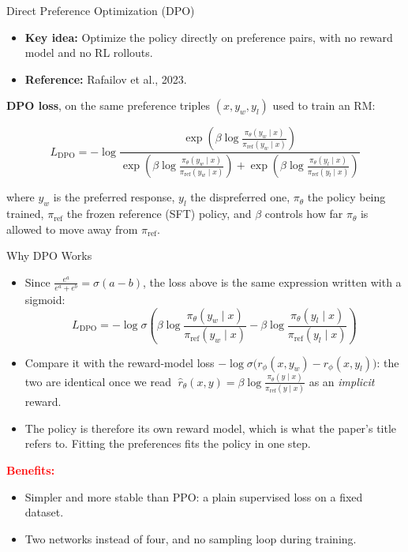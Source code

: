 \begin{frame}[t]{Direct Preference Optimization (DPO)}
  \begin{itemize}
    \item[\textcolor{red}{$\blacktriangleright$}] \textbf{Key idea:} Optimize the policy directly on preference pairs, with no reward model and no RL rollouts.
    \item[\textcolor{red}{$\blacktriangleright$}] \textbf{Reference:} Rafailov et al., 2023.
  \end{itemize}

  \vspace{0.4em}
  \textbf{DPO loss}, on the same preference triples $(x, y_w, y_l)$ used to train an RM:

  \[
  L_{\mathrm{DPO}} = -\log \frac{
      \exp\left(\beta \log \frac{\pi_\theta(y_w \mid x)}{\pi_{\text{ref}}(y_w \mid x)}\right)
    }{
      \exp\left(\beta \log \frac{\pi_\theta(y_w \mid x)}{\pi_{\text{ref}}(y_w \mid x)}\right) + \exp\left(\beta \log \frac{\pi_\theta(y_l \mid x)}{\pi_{\text{ref}}(y_l \mid x)}\right)
    }
  \]

  \footnotesize
  where $y_w$ is the preferred response, $y_l$ the dispreferred one, $\pi_\theta$ the policy being trained, $\pi_{\text{ref}}$ the frozen reference (SFT) policy, and $\beta$ controls how far $\pi_\theta$ is allowed to move away from $\pi_{\text{ref}}$.
\end{frame}

\begin{frame}[t]{Why DPO Works}
  \begin{itemize}\itemsep0.4em
    \item[\textcolor{red}{$\blacktriangleright$}] Since $\frac{e^{a}}{e^{a} + e^{b}} = \sigma(a - b)$, the loss above is the same expression written with a sigmoid:
      \[
        L_{\mathrm{DPO}} = -\log \sigma\!\left(
          \beta \log \frac{\pi_\theta(y_w \mid x)}{\pi_{\text{ref}}(y_w \mid x)}
          - \beta \log \frac{\pi_\theta(y_l \mid x)}{\pi_{\text{ref}}(y_l \mid x)}
        \right)
      \]
    \item[\textcolor{red}{$\blacktriangleright$}] Compare it with the reward-model loss $-\log\sigma\big(r_\phi(x,y_w) - r_\phi(x,y_l)\big)$: the two are identical once we read
      $\;\hat{r}_\theta(x,y) = \beta \log \frac{\pi_\theta(y \mid x)}{\pi_{\text{ref}}(y \mid x)}$ as an \emph{implicit} reward.
    \item[\textcolor{red}{$\blacktriangleright$}] The policy is therefore its own reward model, which is what the paper's title refers to. Fitting the preferences fits the policy in one step.
  \end{itemize}

  \vspace{0.3em}
  \textcolor{red}{\textbf{Benefits:}}
  \begin{itemize}
    \item Simpler and more stable than PPO: a plain supervised loss on a fixed dataset.
    \item Two networks instead of four, and no sampling loop during training.
  \end{itemize}
\end{frame}

